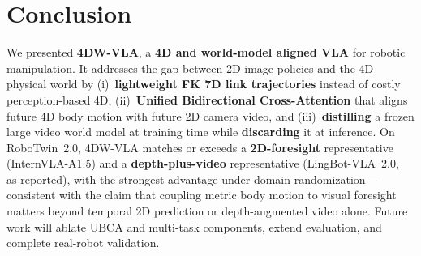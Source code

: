 \section{Conclusion}
\label{sec:conclusion}

We presented \textbf{4DW-VLA}, a \textbf{4D and world-model aligned VLA} for robotic manipulation. It addresses the gap between 2D image policies and the 4D physical world by (i)~\textbf{lightweight FK 7D link trajectories} instead of costly perception-based 4D, (ii)~\textbf{Unified Bidirectional Cross-Attention} that aligns future 4D body motion with future 2D camera video, and (iii)~\textbf{distilling} a frozen large video world model at training time while \textbf{discarding} it at inference. On RoboTwin~2.0, 4DW-VLA matches or exceeds a \textbf{2D-foresight} representative (InternVLA-A1.5) and a \textbf{depth-plus-video} representative (LingBot-VLA~2.0, as-reported), with the strongest advantage under domain randomization---consistent with the claim that coupling metric body motion to visual foresight matters beyond temporal 2D prediction or depth-augmented video alone. Future work will ablate UBCA and multi-task components, extend evaluation, and complete real-robot validation.
